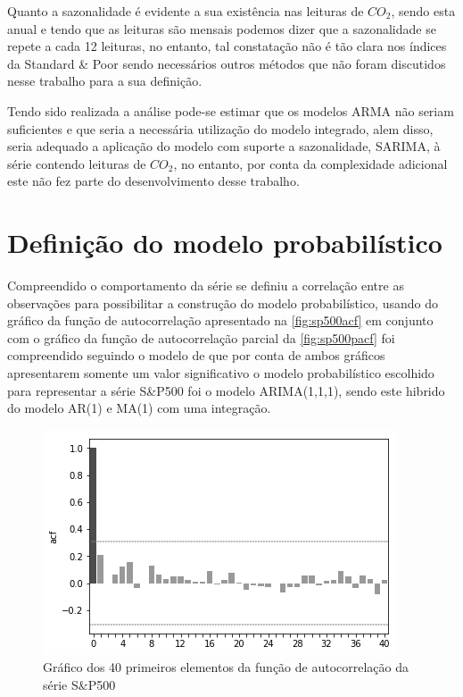 \documentclass[
    12pt,
    oneside,
    a4paper,
    english,
    brazil
]{abntex2}
\begin{document}
Quanto a sazonalidade é evidente a sua existência nas leituras de $CO_2$, sendo
esta anual e tendo que as leituras são mensais podemos dizer que a sazonalidade
se repete a cada  12 leituras, no entanto, tal constatação não  é tão clara nos
índices da  Standard \&  Poor sendo  necessários outros  métodos que  não foram
discutidos nesse trabalho para a sua definição.

Tendo sido realizada  a análise pode-se estimar que os  modelos ARMA não seriam
suficientes  e que  seria a  necessária  utilização do  modelo integrado,  alem
disso, seria adequado a aplicação do modelo com suporte a sazonalidade, SARIMA,
à série  contendo leituras  de $CO_2$,  no entanto,  por conta  da complexidade
adicional este não fez parte do desenvolvimento desse trabalho.

\section{Definição do modelo probabilístico}


Compreendido  o  comportamento  da  série  se definiu  a  correlação  entre  as
observações para possibilitar a construção  do modelo probabilístico, usando do
gráfico  da  função  de autocorrelação  apresentado  na  \autoref{fig:sp500acf}
em   conjunto  com   o  gráfico   da  função   de  autocorrelação   parcial  da
\autoref{fig:sp500pacf} foi compreendido seguindo  o modelo de 
que por conta  de ambos gráficos apresentarem somente um  valor significativo o
modelo probabilístico escolhido  para representar a série S\&P500  foi o modelo
ARIMA(1,1,1), sendo este hibrido do modelo AR(1) e MA(1) com uma integração.

\begin{figure}[ht]
    \centering
    \caption{Gráfico dos 40 primeiros elementos da função de autocorrelação da
    série S\&P500}\label{fig:sp500acf}
    \includegraphics[width=.5\linewidth]{images/sp500acf.png}
\end{figure}
\end{document}
